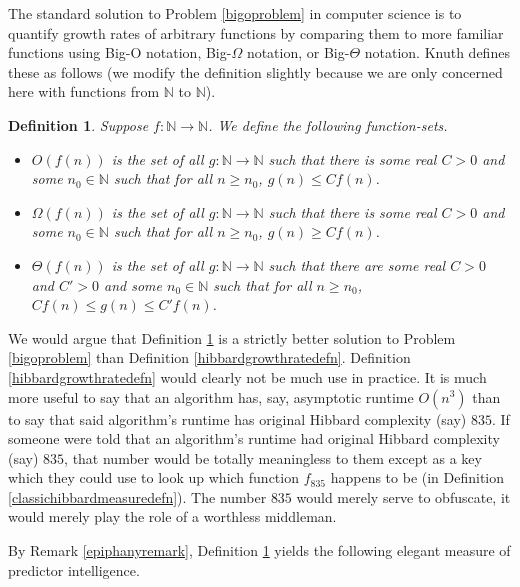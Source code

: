 \documentclass{article}
\newtheorem{definition}[theorem]{Definition}
\begin{document}
The standard solution to Problem \ref{bigoproblem} in computer science is to quantify
growth rates of arbitrary functions by comparing them to more familiar functions using
Big-O notation, Big-$\Omega$ notation, or Big-$\Theta$ notation.
Knuth defines \cite{knuth1976big} these as follows (we modify the definition slightly because
we are only concerned here with functions from $\mathbb N$ to $\mathbb N$).

\begin{definition}
\label{bigodefn}
    Suppose $f:\mathbb N\to\mathbb N$. We define the following function-sets.
    \begin{itemize}
        \item
        $O(f(n))$ is the set of all $g:\mathbb N\to\mathbb N$ such that
        there is some real $C>0$ and some $n_0\in\mathbb N$ such that
        for all $n\geq n_0$, $g(n)\leq Cf(n)$.
        \item
        $\Omega(f(n))$ is the set of all $g:\mathbb N\to\mathbb N$ such that
        there is some real $C>0$ and some $n_0\in\mathbb N$ such that
        for all $n\geq n_0$, $g(n)\geq Cf(n)$.
        \item
        $\Theta(f(n))$ is the set of all $g:\mathbb N\to\mathbb N$ such that
        there are some real $C>0$ and $C'>0$ and some $n_0\in\mathbb N$ such that
        for all $n\geq n_0$, $Cf(n)\leq g(n)\leq C'f(n)$.
    \end{itemize}
\end{definition}

We would argue that Definition \ref{bigodefn} is a strictly better solution to
Problem \ref{bigoproblem} than Definition \ref{hibbardgrowthratedefn}.
Definition \ref{hibbardgrowthratedefn} would clearly not be much use in
practice. It is much more useful to say that an algorithm has, say, asymptotic
runtime $O(n^3)$ than to say that said algorithm's runtime has original Hibbard
complexity (say) $835$. If someone were told that an algorithm's runtime had
original Hibbard complexity (say) $835$, that number would be totally meaningless
to them except as a key which they could use to look up which function $f_{835}$
happens to be (in Definition \ref{classichibbardmeasuredefn}). The number
$835$ would merely serve to obfuscate, it would merely play the role of a worthless
middleman.

By Remark \ref{epiphanyremark}, Definition \ref{bigodefn} yields the following elegant
measure of predictor intelligence.
\end{document}
